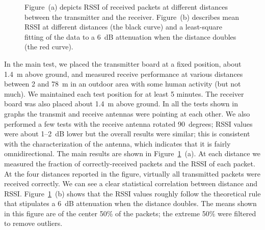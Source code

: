 
\begin{figure}[h]
    \centering
    \hspace{0.01in}
    \caption{Figure~(a) depicts RSSI of received packets at different distances between 
    the transmitter and the receiver. Figure~(b) describes mean RSSI at 
    different distances (the black curve) and a least-square
    fitting of the data to a 6~dB attenuation when the distance doubles
(the red curve).}
    \label{fig:rssi}
\end{figure}

In the main test, we placed the transmitter board at a fixed position, about 1.4~m above ground, and measured receive
performance at various distances between 2 and 78~m in an outdoor area with some human activity (but not much). We 
maintained each test position for at least 5 minutes.
The receiver board was also placed about 1.4~m above ground. In all the tests shown in graphs the transmit
and receive antennas were pointing at each other. We also performed a few tests with the receive antenna rotated 90~degrees;
RSSI values were about 1--2~dB lower but the overall results were similar; this is consistent with the characterization
of the antenna, which indicates that it is fairly omnidirectional.
The main results are shown in Figure~\ref{fig:rssi}~(a).
At each distance we measured the fraction of correctly-received packets and the RSSI of each packet. At the four
distances reported in the figure, virtually all transmitted packets were received correctly. We can see a clear
statistical correlation between distance and RSSI. Figure~\ref{fig:rssi}~(b) shows that the RSSI values
roughly follow the theoretical rule that stipulates a 6~dB attenuation when the distance doubles. The means
shown in this figure are of the center 50\% of the packets; the extreme 50\% were filtered to remove outliers.

